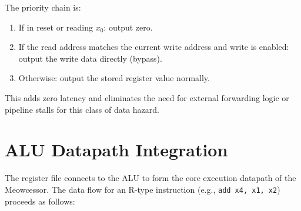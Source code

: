 \documentclass[12pt,a4paper]{article}
\begin{document}
The priority chain is:
\begin{enumerate}
    \item If in reset or reading $x_0$: output zero.
    \item If the read address matches the current write address and write is enabled: output the write data directly (bypass).
    \item Otherwise: output the stored register value normally.
\end{enumerate}

This adds zero latency and eliminates the need for external forwarding logic or pipeline stalls for this class of data hazard.

\section{ALU Datapath Integration}

The register file connects to the ALU to form the core execution datapath of the Meowcessor. The data flow for an R-type instruction (e.g., \texttt{add x4, x1, x2}) proceeds as follows:
\end{document}
